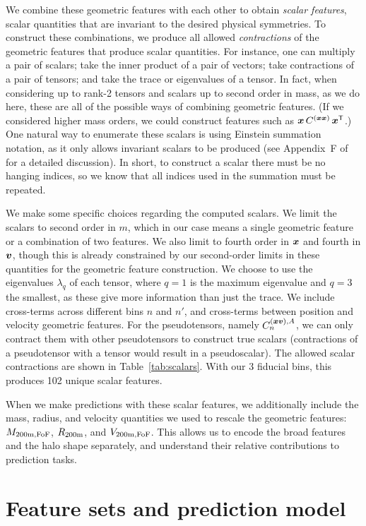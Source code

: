 We combine these geometric features with each other to obtain \emph{scalar features}, scalar quantities that are invariant to the desired physical symmetries.
To construct these combinations, we produce all allowed \emph{contractions} of the geometric features that produce scalar quantities.
For instance, one can multiply a pair of scalars; take the inner product of a pair of vectors; take contractions of a pair of tensors; and take the trace or eigenvalues of a tensor.
In fact, when considering up to rank-2 tensors and scalars up to second order in mass, as we do here, these are all of the possible ways of combining geometric features.
(If we considered higher mass orders, we could construct features such as $\bm{x} \, C^{(\bm{x}\bm{x})} \, \bm{x}^{\mathsf{T}}$.)
One natural way to enumerate these scalars is using Einstein summation notation, as it only allows invariant scalars to be produced (see Appendix~F of \citealt{Villar2021a} for a detailed discussion).
In short, to construct a scalar there must be no hanging indices, so we know that all indices used in the summation must be repeated.

We make some specific choices regarding the computed scalars.
We limit the scalars to second order in $m$, which in our case means a single geometric feature or a combination of two features.
We also limit to fourth order in $\bm{x}$ and fourth in $\bm{v}$, though this is already constrained by our second-order limits in these quantities for the geometric feature construction.
We choose to use the eigenvalues $\lambda_q$ of each tensor, where $q=1$ is the maximum eigenvalue and $q=3$ the smallest, as these give more information than just the trace.
We include cross-terms across different bins $n$ and $n'$, and cross-terms between position and velocity geometric features.
For the pseudotensors, namely $C^{(\bm{x}\bm{v}),A}_n$, we can only contract them with other pseudotensors to construct true scalars (contractions of a pseudotensor with a tensor would result in a pseudoscalar).
The allowed scalar contractions are shown in Table~\ref{tab:scalars}.
With our 3 fiducial bins, this produces 102 unique scalar features.

When we make predictions with these scalar features, we additionally include the mass, radius, and velocity quantities we used to rescale the geometric features: $M_\mathrm{200m,FoF}$, $R_\mathrm{200m}$, and $V_\mathrm{200m,FoF}$. 
This allows us to encode the broad features and the halo shape separately, and understand their relative contributions to prediction tasks.


\section{Feature sets and prediction model}
\label{sec:features_model}

